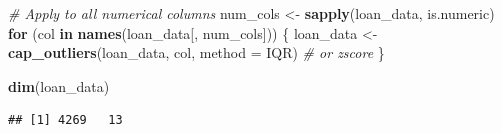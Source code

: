 \documentclass[
]{article}
\newenvironment{Shaded}{\begin{snugshade}}{\end{snugshade}}
\newcommand{\AttributeTok}[1]{\textcolor[rgb]{0.13,0.29,0.53}{#1}}
\newcommand{\CommentTok}[1]{\textcolor[rgb]{0.56,0.35,0.01}{\textit{#1}}}
\newcommand{\ControlFlowTok}[1]{\textcolor[rgb]{0.13,0.29,0.53}{\textbf{#1}}}
\newcommand{\FunctionTok}[1]{\textcolor[rgb]{0.13,0.29,0.53}{\textbf{#1}}}
\newcommand{\NormalTok}[1]{#1}
\newcommand{\OtherTok}[1]{\textcolor[rgb]{0.56,0.35,0.01}{#1}}
\newcommand{\StringTok}[1]{\textcolor[rgb]{0.31,0.60,0.02}{#1}}
\begin{document}
\begin{Shaded}
\begin{Highlighting}[]
\CommentTok{\# Apply to all numerical columns}
\NormalTok{num\_cols }\OtherTok{\textless{}{-}} \FunctionTok{sapply}\NormalTok{(loan\_data, is.numeric)}
\ControlFlowTok{for}\NormalTok{ (col }\ControlFlowTok{in} \FunctionTok{names}\NormalTok{(loan\_data[, num\_cols])) \{}
\NormalTok{  loan\_data }\OtherTok{\textless{}{-}} \FunctionTok{cap\_outliers}\NormalTok{(loan\_data, col, }\AttributeTok{method =} \StringTok{\textquotesingle{}IQR\textquotesingle{}}\NormalTok{)  }\CommentTok{\# or \textquotesingle{}zscore\textquotesingle{}}
\NormalTok{\}}

\FunctionTok{dim}\NormalTok{(loan\_data)}
\end{Highlighting}
\end{Shaded}

\begin{verbatim}
## [1] 4269   13
\end{verbatim}
\end{document}
